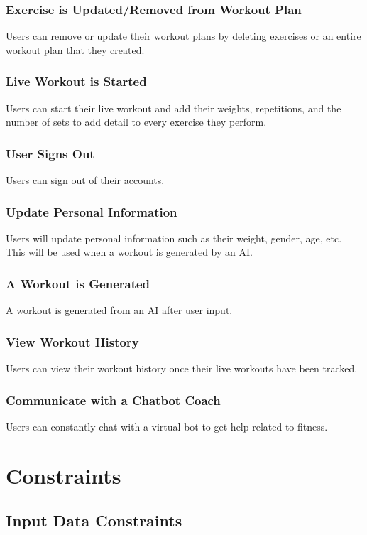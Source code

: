 \documentclass[12pt]{article}
\begin{document}
\subsubsection{Exercise is Updated/Removed from Workout Plan}
Users can remove or update their workout plans by deleting exercises or an entire workout plan that they created.

\subsubsection{Live Workout is Started}
Users can start their live workout and add their weights, repetitions, and the number of sets to add detail to every exercise they perform.

\subsubsection{User Signs Out}
Users can sign out of their accounts.

\subsubsection{Update Personal Information}
Users will update personal information such as their weight, gender, age, etc. This will be used when a workout is generated by an AI.

\subsubsection{A Workout is Generated}
A workout is generated from an AI after user input.

\subsubsection{View Workout History}
Users can view their workout history once their live workouts have been tracked.

\subsubsection{Communicate with a Chatbot Coach}
Users can constantly chat with a virtual bot to get help related to fitness.


\section{Constraints}

\subsection{Input Data Constraints}
\end{document}
